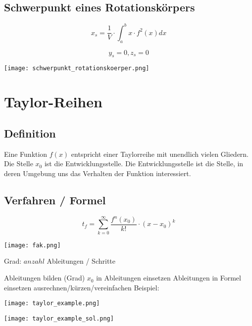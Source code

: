 \begin{multicols*}{3}
    \subsection{Schwerpunkt eines Rotationskörpers}

    \begin{multicols}{2}

        {$$x_s =\frac{1}{V}\cdot \int_{a}^{b}x \cdot f^2(x)dx$$}

        {$$y_s = 0 , z_s = 0$$}

        \columnbreak
        \texttt{[image: schwerpunkt\_rotationskoerper.png]}

    \end{multicols}

    \vfill\null
    \newpage
    \section{Taylor-Reihen}
    \subsection{Definition}
    {Eine Funktion $f(x)$ entspricht einer Taylorreihe mit unendlich vielen Gliedern. Die Stelle $x_0$ ist die Entwicklungsstelle. Die Entwicklungsstelle ist die Stelle, in deren Umgebung uns das Verhalten der Funktion interessiert.}
    \WhiteSpace
    \subsection{Verfahren / Formel}

    \begin{multicols*}{2}

        $$t_f = \sum_{k = 0}^{ \infty }\frac{f^n(x_0)}{k!}\cdot(x-x_0)^k$$

        \columnbreak
        \texttt{[image: fak.png]}

    \end{multicols*}
    {Grad: $anzahl$ Ableitungen / Schritte}

    { Ableitungen bilden (Grad)}
    \WhiteSpace
    { $x_0$ in Ableitungen einsetzen}
    \WhiteSpace
    { Ableitungen in Formel einsetzen}
    \WhiteSpace
    { ausrechnen/kürzen/vereinfachen}
    \WhiteSpace
    {Beispiel:}

    \texttt{[image: taylor\_example.png]}

    \texttt{[image: taylor\_example\_sol.png]}
    \vfill\null
    \columnbreak

\end{multicols*}
